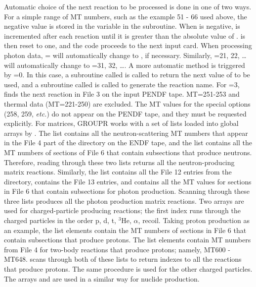 Automatic choice of the next reaction to be processed is done in one of
two ways.  For a simple range of MT numbers, such as the example 51 - 66
used above, the negative value is stored in the variable 
in the  subroutine.  When  is negative,
 is incremented after each reaction until it is greater than
the absolute value of .   is then reset to one,
and the code proceeds to the next input card.  When processing photon
data, =
will automatically change to , if necessary.  Similarly,
=21, 22, \ldots will automatically change to
=31, 32, \ldots.  A more automatic method is triggered by
=0.  In this case, a subroutine called
 is called to return
the next value of  to be used, and a subroutine called
 is called to generate the
reaction name.  For =3,  finds the next
reaction in File 3 on the input PENDF tape.  MT=251-253 and
thermal data (MT=221-250) are excluded.  The MT values for the
special options (258, 259, {\it etc.}) do not appear on the PENDF
tape, and they must be requested explicitly.  For matrices,
GROUPR works with a set of lists loaded into global arrays by
.  The list 
contains all the neutron-scattering MT numbers that appear in the
File 4 part of the directory on the ENDF tape, and the list
 contains all the MT numbers of sections of File 6 that
contain subsections that produce neutrons.  Therefore, reading
through these two lists returns all the neutron-producing matrix
reactions.  Similarly, the list  contains all the
File 12 entries from the directory,  contains the
File 13 entries, and  contains all the MT
values for sections in File 6 that contain subsections for photon
production.  Scanning through these three lists produces all the
photon production matrix reactions.  Two arrays are used for
charged-particle producing reactions; the first index runs through
the charged particles in the order p, d, t, $^3$He, $\alpha$, recoil.
Taking proton production as an example, the list elements
 contain the MT numbers of sections in File 6 that
contain subsections that produce protons.  The list elements
 contain MT numbers from File 4 for two-body reactions
that produce protons; namely, MT600 - MT648.   scans through
both of these lists to return indexes to all the reactions that produce
protons.  The same procedure is used for the other charged particles.
The arrays  and  are used in a similar
way for nuclide production.


